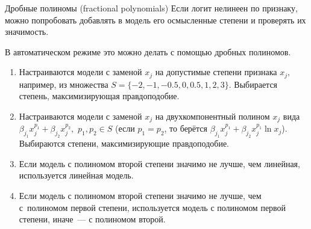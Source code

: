 \documentclass[9pt,pdf,utf8,hyperref={unicode},aspectratio=169]{beamer}
\begin{document}
\begin{frame}{Дробные полиномы (fractional polynomials)}
    Если логит нелинеен по признаку, можно попробовать добавлять в модель его осмысленные степени и проверять их значимость.

    В автоматическом режиме это можно делать с помощью дробных полиномов.
    \begin{enumerate}
    \item Настраиваются модели с заменой $x_j$ на допустимые степени признака $x_j,$ например, из множества $S = \{{-2,-1,-0.5, 0, 0.5, 1, 2, 3}\}.$ Выбирается степень, максимизирующая правдоподобие.
    \item Настраиваются модели с заменой $x_j$ на двухкомпонентный полином $x_j$ вида $\beta_{j_1}x_j^{p_1} + \beta_{j_2}x_j^{p_2},$ \; $p_1,p_2\in S$ (если $p_1=p_2$, то берётся $\beta_{j_1}x_j^{p_1} + \beta_{j_2}x_j^{p_1}\ln x_j$). Выбираются степени, максимизирующие правдоподобие.
    \item Если модель с полиномом второй степени значимо не лучше, чем линейная, используется линейная модель.
    \item Если модель с полиномом второй степени значимо не лучше, чем с~полиномом первой степени, используется модель с полиномом первой степени, иначе~--- с полиномом второй.
    \end{enumerate}
\end{frame}
\end{document}
